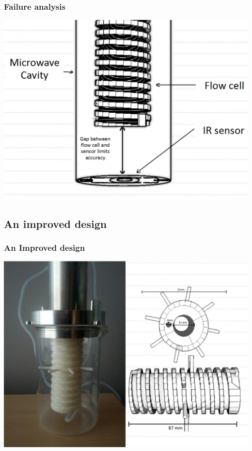 \documentclass[10pt, compress]{beamer}
\begin{document}
\begin{frame}
\frametitle{Failure analysis}\vspace{-1cm}
\includegraphics[width=\textwidth]{fanalysis.PNG}
\end{frame}

\subsection{An improved design}
\begin{frame}
\frametitle{An Improved design}\vspace{-1cm}
\includegraphics[width=\textwidth]{improvdesign.PNG}
\end{frame}
\end{document}
